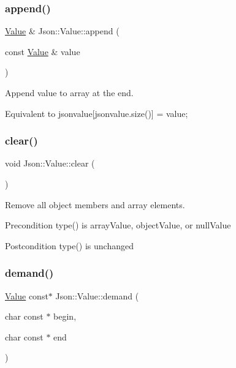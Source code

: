 \subsubsection{\texorpdfstring{append()}{append()}}
{\footnotesize\ttfamily \hyperlink{classJson_1_1Value}{Value} \& Json\+::\+Value\+::append (\begin{DoxyParamCaption}\item[{const \hyperlink{classJson_1_1Value}{Value} \&}]{value }\end{DoxyParamCaption})}



Append value to array at the end. 

Equivalent to jsonvalue\mbox{[}jsonvalue.\+size()\mbox{]} = value; \mbox{\label{classJson_1_1Value_a501a4d67e6c875255c2ecc03ccd2019b}} 
\subsubsection{\texorpdfstring{clear()}{clear()}}
{\footnotesize\ttfamily void Json\+::\+Value\+::clear (\begin{DoxyParamCaption}{ }\end{DoxyParamCaption})}

Remove all object members and array elements. \begin{DoxyPrecond}{Precondition}
type() is array\+Value, object\+Value, or null\+Value 
\end{DoxyPrecond}
\begin{DoxyPostcond}{Postcondition}
type() is unchanged 
\end{DoxyPostcond}
\mbox{\label{classJson_1_1Value_afeb7ff596a0929d90c5f2f3cffb413ed}} 
\subsubsection{\texorpdfstring{demand()}{demand()}}
{\footnotesize\ttfamily \hyperlink{classJson_1_1Value}{Value} const$\ast$ Json\+::\+Value\+::demand (\begin{DoxyParamCaption}\item[{char const $\ast$}]{begin,  }\item[{char const $\ast$}]{end }\end{DoxyParamCaption})}

